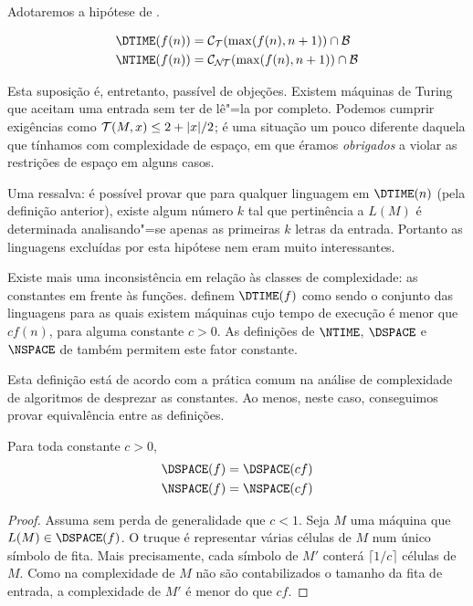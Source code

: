 Adotaremos a hipótese de .
\begin{definition}
    \begin{align*}
        \DTIME(f(n)) &= \mathcal C_\PhiDT(\max(f(n), n+1)) \cap \mathcal B \\
        \NTIME(f(n)) &= \mathcal C_\PhiNT(\max(f(n), n+1)) \cap \mathcal B
    \end{align*}
\end{definition}

Esta suposição é,
entretanto,
passível de objeções.
Existem máquinas de Turing
que aceitam uma entrada
sem ter de lê"=la por completo.
Podemos cumprir exigências como
${\mathcal{T}}(M, x) \leq 2 + |x|/2$;
é uma situação um pouco diferente
daquela que tínhamos com complexidade de espaço,
em que éramos \emph{obrigados}
a violar as restrições de espaço
em alguns casos.

Uma ressalva:
é possível provar que
para qualquer linguagem em $\DTIME(n)$
(pela definição anterior),
existe algum número $k$ tal que
pertinência a $L(M)$
é determinada analisando"=se
apenas as primeiras $k$ letras da entrada.
Portanto as linguagens excluídas por esta hipótese
nem eram muito interessantes.

Existe mais uma inconsistência
em relação às classes de complexidade:
as constantes em frente às funções.
definem $\DTIME(f)$ como sendo o conjunto das linguagens
para as quais existem máquinas cujo tempo de execução
é menor que $c f(n)$, para alguma constante $c > 0$.
As definições de $\NTIME$, $\DSPACE$ e $\NSPACE$
de 
também permitem este fator constante.

Esta definição está de acordo com
a prática comum na análise de complexidade de algoritmos
de desprezar as constantes.
Ao menos,
neste caso,
conseguimos provar equivalência entre as definições.

\begin{theorem}
    Para toda constante $c > 0$,
    \begin{align*}
        \DSPACE(f) & = \DSPACE(cf) \\
        \NSPACE(f) & = \NSPACE(cf)
    \end{align*}
\end{theorem}

\begin{proof}
    Assuma sem perda de generalidade que $c < 1$.
    Seja $M$ uma máquina que $L(M) \in \DSPACE(f)$.
    O truque é representar várias células de $M$
    num único símbolo de fita.
    Mais precisamente,
    cada símbolo de $M'$ conterá
    $\lceil 1/c \rceil$ células de $M$.
    Como na complexidade de $M$
    não são contabilizados o tamanho da fita de entrada,
    a complexidade de $M'$ é menor do que $cf$.
\end{proof}


